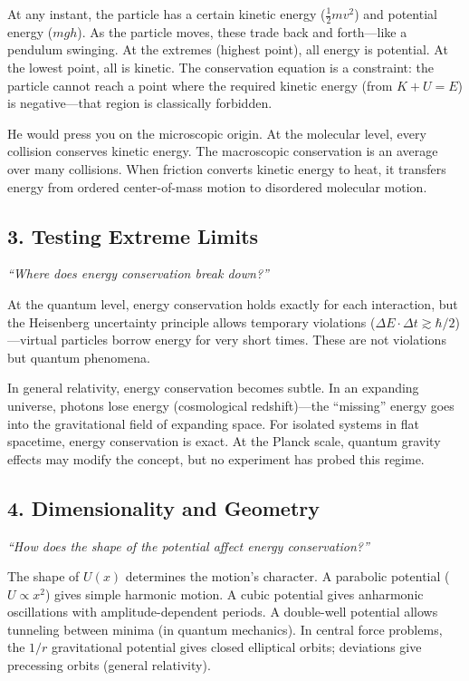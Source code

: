 At any instant, the particle has a certain kinetic energy ($\frac{1}{2}mv^2$) and potential energy ($mgh$). As the particle moves, these trade back and forth---like a pendulum swinging. At the extremes (highest point), all energy is potential. At the lowest point, all is kinetic. The conservation equation is a constraint: the particle cannot reach a point where the required kinetic energy (from $K + U = E$) is negative---that region is classically forbidden.

He would press you on the microscopic origin. At the molecular level, every collision conserves kinetic energy. The macroscopic conservation is an average over many collisions. When friction converts kinetic energy to heat, it transfers energy from ordered center-of-mass motion to disordered molecular motion.

\subsection*{3. Testing Extreme Limits}
\textit{``Where does energy conservation break down?''}

At the quantum level, energy conservation holds exactly for each interaction, but the Heisenberg uncertainty principle allows temporary violations ($\Delta E \cdot \Delta t \gtrsim \hbar/2$)---virtual particles borrow energy for very short times. These are not violations but quantum phenomena.

In general relativity, energy conservation becomes subtle. In an expanding universe, photons lose energy (cosmological redshift)---the ``missing'' energy goes into the gravitational field of expanding space. For isolated systems in flat spacetime, energy conservation is exact. At the Planck scale, quantum gravity effects may modify the concept, but no experiment has probed this regime.

\subsection*{4. Dimensionality and Geometry}
\textit{``How does the shape of the potential affect energy conservation?''}

The shape of $U(x)$ determines the motion's character. A parabolic potential ($U \propto x^2$) gives simple harmonic motion. A cubic potential gives anharmonic oscillations with amplitude-dependent periods. A double-well potential allows tunneling between minima (in quantum mechanics). In central force problems, the $1/r$ gravitational potential gives closed elliptical orbits; deviations give precessing orbits (general relativity).


